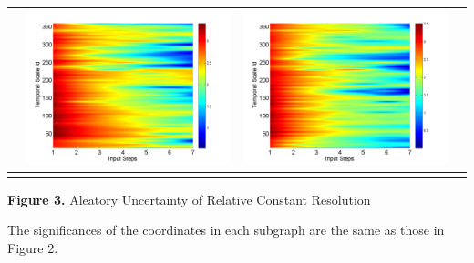 \documentclass[review]{elsarticle}
\begin{document}
\begin{table}[H]
\begin{tabular}{cccc}
&\begin{minipage}{.3\textwidth}\includegraphics[width=\linewidth]{resultgraph/06810000pep_rela.png}\end{minipage}
&\begin{minipage}{.3\textwidth}\includegraphics[width=\linewidth]{resultgraph/06810000pepq_rela.png}\end{minipage}
\\
\hline
\\
\end{tabular}

\Large{\textbf{Figure 3.} Aleatory Uncertainty of Relative Constant Resolution}
\end{table}
The significances of the coordinates in each subgraph are the same as those in Figure 2.
\end{document}
